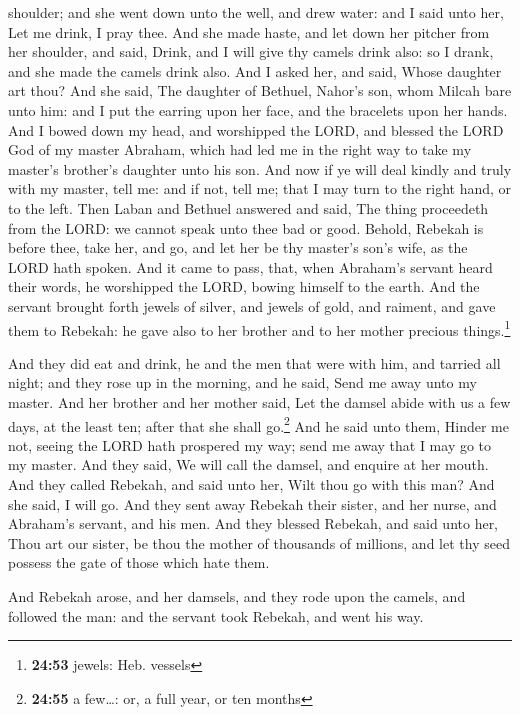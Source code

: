 shoulder; and she went down unto the well, and drew water: and I said
unto her, Let me drink, I pray thee.  And she made haste,
and let down her pitcher from her shoulder, and said, Drink, and I will
give thy camels drink also: so I drank, and she made the camels drink
also.  And I asked her, and said, Whose daughter art
thou? And she said, The daughter of Bethuel, Nahor's son, whom Milcah
bare unto him: and I put the earring upon her face, and the bracelets
upon her hands.  And I bowed down my head, and worshipped
the LORD, and blessed the LORD God of my master Abraham, which had led
me in the right way to take my master's brother's daughter unto his son.
 And now if ye will deal kindly and truly with my master,
tell me: and if not, tell me; that I may turn to the right hand, or to
the left.  Then Laban and Bethuel answered and said, The
thing proceedeth from the LORD: we cannot speak unto thee bad or good.
 Behold, Rebekah is before thee, take her, and go, and
let her be thy master's son's wife, as the LORD hath spoken.
 And it came to pass, that, when Abraham's servant heard
their words, he worshipped the LORD, bowing himself to the earth.
 And the servant brought forth jewels of silver, and
jewels of gold, and raiment, and gave them to Rebekah: he gave also to
her brother and to her mother precious things.\footnote{\textbf{24:53}
  jewels: Heb. vessels}

 And they did eat and drink, he and the men that were
with him, and tarried all night; and they rose up in the morning, and he
said, Send me away unto my master.  And her brother and
her mother said, Let the damsel abide with us a few days, at the least
ten; after that she shall go.\footnote{\textbf{24:55} a few\ldots: or, a
  full year, or ten months}  And he said unto them,
Hinder me not, seeing the LORD hath prospered my way; send me away that
I may go to my master.  And they said, We will call the
damsel, and enquire at her mouth.  And they called
Rebekah, and said unto her, Wilt thou go with this man? And she said, I
will go.  And they sent away Rebekah their sister, and
her nurse, and Abraham's servant, and his men.  And they
blessed Rebekah, and said unto her, Thou art our sister, be thou the
mother of thousands of millions, and let thy seed possess the gate of
those which hate them.

 And Rebekah arose, and her damsels, and they rode upon
the camels, and followed the man: and the servant took Rebekah, and went
his way.

